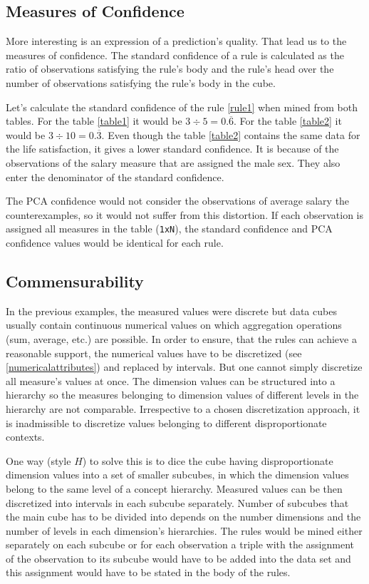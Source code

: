\subsection{Measures of Confidence}

More interesting is an expression of a prediction's quality. That lead us to the measures of confidence. The standard confidence of a rule is calculated as the ratio of observations satisfying the rule's body and the rule's head over the number of observations satisfying the rule's body in the cube.

Let's calculate the standard confidence of the rule \ref{rule1} when mined from both tables. For the table \ref{table1} it would be $3 \div 5 = 0.\overline{6}$. For the table \ref{table2} it would be $3 \div 10 = 0.\overline{3}$. Even though the table \ref{table2} contains the same data for the life satisfaction, it gives a lower standard confidence. It is because of the observations of the salary measure that are assigned the male sex. They also enter the denominator of the standard confidence. 

The PCA confidence would not consider the observations of average salary the counterexamples, so it would not suffer from this distortion. If each observation is assigned all measures in the table (\verb|1xN|), the standard confidence and PCA confidence values would be identical for each rule.

\subsection{Commensurability\label{commensurability}}

In the previous examples, the measured values were discrete but data cubes usually contain continuous numerical values on which aggregation operations (sum, average, etc.) are possible. In order to ensure, that the rules can achieve a reasonable support, the numerical values have to be discretized (see \ref{numericalattributes}) and replaced by intervals. But one cannot simply discretize all measure's values at once. The dimension values can be structured into a hierarchy so the measures belonging to dimension values of different levels in the hierarchy are not comparable.\cite{Chudan2015} Irrespective to a chosen discretization approach, it is inadmissible to discretize values belonging to different disproportionate contexts.

One way (style $H$) to solve this is to dice the cube having disproportionate dimension values into a set of smaller subcubes, in which the dimension values belong to the same level of a concept hierarchy. Measured values can be then discretized into intervals in each subcube separately. Number of subcubes that the main cube has to be divided into depends on the number dimensions and the number of levels in each dimension’s hierarchies. The rules would be mined either separately on each subcube or for each observation a triple with the assignment of the observation to its subcube would have to be added into the data set and this assignment would have to be stated in the body of the rules.

